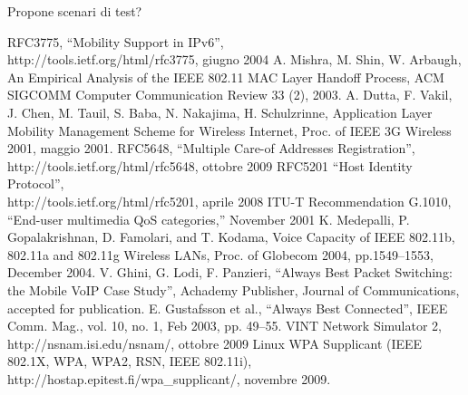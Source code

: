 \documentclass[12pt,a4paper,openright,twoside]{book}
\begin{document}
Propone scenari di test?

\clearpage{\pagestyle{empty}\cleardoublepage}



\begin{thebibliography}{90}
\rhead[\fancyplain{}{\bfseries \leftmark}]{\fancyplain{}{\bfseries
\thepage}}
 RFC3775, ``Mobility Support in IPv6'',\\
  http://tools.ietf.org/html/rfc3775, giugno 2004
 A. Mishra, M. Shin, W. Arbaugh, An
  Empirical Analysis of the IEEE 802.11 MAC Layer Handoff Process, ACM
  SIGCOMM Computer Communication Review 33 (2), 2003.
 A. Dutta, F. Vakil, J. Chen,
  M. Tauil, S. Baba, N. Nakajima, H.  Schulzrinne, Application Layer
  Mobility Management Scheme for Wireless Internet, Proc. of IEEE 3G
  Wireless 2001, maggio 2001.
 RFC5648, ``Multiple Care-of Addresses
  Registration'',\\http://tools.ietf.org/html/rfc5648, ottobre 2009
 RFC5201 ``Host Identity Protocol'',\\
  http://tools.ietf.org/html/rfc5201, aprile 2008
 ITU-T Recommendation G.1010, “End-user multimedia
  QoS categories,” November 2001
 K. Medepalli, P. Gopalakrishnan, D. Famolari,
  and T. Kodama, Voice Capacity of IEEE 802.11b, 802.11a and 802.11g
  Wireless LANs, Proc. of Globecom 2004, pp.1549–1553, December 2004.
 V. Ghini, G. Lodi, F. Panzieri, ``Always Best
  Packet Switching: the Mobile VoIP Case Study'', Achademy Publisher,
  Journal of Communications, accepted for publication.
 E. Gustafsson et al., ``Always Best Connected'',
  IEEE Comm. Mag., vol. 10, no. 1, Feb 2003, pp. 49--55.
 VINT Network Simulator 2,
  http://nsnam.isi.edu/nsnam/, ottobre 2009
 Linux WPA Supplicant (IEEE 802.1X, WPA,
  WPA2, RSN, IEEE 802.11i), http://hostap.epitest.fi/wpa\_supplicant/,
  novembre 2009.
\end{thebibliography}
\end{document}
